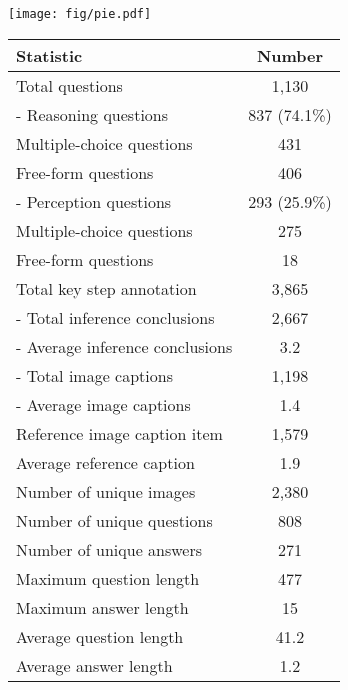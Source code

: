 \begin{enumerate}
\end{enumerate}

\begin{figure*}[!t]
\vspace{0.15cm}
\centering
\begin{minipage}[c]{0.63\textwidth}
\texttt{[image: fig/pie.pdf]}
\label{pie}
\end{minipage} \hspace{3pt}   
\begin{minipage}[c]{0.34\textwidth}
\small
\centering
\vspace{-2pt}
\begin{adjustbox}{width=0.82\textwidth}
\begin{tabular}{lc}
\toprule
\textbf{Statistic} & \textbf{Number} \\
\midrule
Total questions & 1,130 \\
\quad - Reasoning questions & 837 (74.1\%) \\
\quad \quad Multiple-choice questions & 431 \\
\quad \quad Free-form questions & 406 \\
\quad - Perception questions & 293 (25.9\%) \\
\quad \quad Multiple-choice questions & 275 \\
\quad \quad Free-form questions & 18 \\
\midrule
Total key step annotation & 3,865 \\
\quad - Total inference conclusions & 2,667 \\
\quad - Average inference conclusions & 3.2 \\
\quad - Total image captions & 1,198 \\
\quad - Average image captions & 1.4 \\
Reference image caption item & 1,579 \\
Average reference caption & 1.9 \\
\midrule
Number of unique images & 2,380 \\
Number of unique questions & 808 \\
Number of unique answers & 271 \\
\midrule
Maximum question length & 477 \\
Maximum answer length & 15 \\
Average question length & 41.2 \\
Average answer length & 1.2 \\
\bottomrule
\end{tabular}
\end{adjustbox}
\vspace{-3pt}
\label{table:statistics}
\end{minipage}
\vspace{-0.2cm}
\end{figure*}


